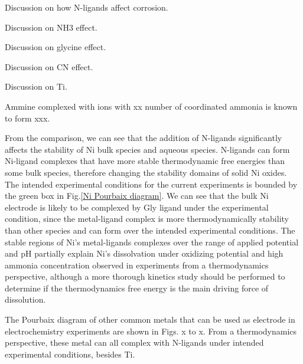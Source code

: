 \documentclass[journal=jacsat,manuscript=article]{achemso}
\begin{document}
Discussion on how N-ligands affect corrosion.

Discussion on NH3 effect. 


Discussion on glycine effect. 


Discussion on CN effect. 


Discussion on Ti. 


Ammine complexed with ions with xx number of coordinated ammonia is known to form xxx. 

From the comparison, we can see that the addition of N-ligands significantly affects the stability of Ni bulk species and aqueous species. N-ligands can form Ni-ligand complexes that have more stable thermodynamic free energies than some bulk species, therefore changing the stability domains of solid Ni oxides. The intended experimental conditions for the current experiments is bounded by the green box in Fig.\ref{Ni Pourbaix diagram}. We can see that the bulk Ni electrode is likely to be complexed by Gly ligand under the experimental condition, since the metal-ligand complex is more thermodynamically stability than other species and can form over the intended experimental conditions. The stable regions of Ni's metal-ligands complexes over the range of applied potential and pH partially explain Ni's dissolvation under oxidizing potential and high ammonia concentration observed in experiments from a thermodynamics perspective, although a more thorough kinetics study should be performed to determine if the thermodynamics free energy is the main driving force of dissolution. 

The Pourbaix diagram of other common metals that can be used as electrode in electrochemistry experiments are shown in Figs. x to x. From a thermodynamics perspective, these metal can all complex with N-ligands under intended experimental conditions, besides Ti. 

\end{document}
